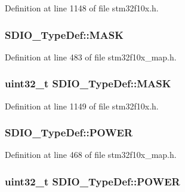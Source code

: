 Definition at line 1148 of file stm32f10x.\+h.

\subsubsection[{\texorpdfstring{M\+A\+SK}{MASK}}]{ S\+D\+I\+O\+\_\+\+Type\+Def\+::\+M\+A\+SK}\hypertarget{struct_s_d_i_o___type_def_a1a4242c4c212eedbc558577e7f42629d}{}\label{struct_s_d_i_o___type_def_a1a4242c4c212eedbc558577e7f42629d}


Definition at line 483 of file stm32f10x\+\_\+map.\+h.

\subsubsection[{\texorpdfstring{M\+A\+SK}{MASK}}]{ {\bf uint32\+\_\+t} S\+D\+I\+O\+\_\+\+Type\+Def\+::\+M\+A\+SK}\hypertarget{struct_s_d_i_o___type_def_a9a08e405ab985c60ff9031025ab37d31}{}\label{struct_s_d_i_o___type_def_a9a08e405ab985c60ff9031025ab37d31}


Definition at line 1149 of file stm32f10x.\+h.

\subsubsection[{\texorpdfstring{P\+O\+W\+ER}{POWER}}]{ S\+D\+I\+O\+\_\+\+Type\+Def\+::\+P\+O\+W\+ER}\hypertarget{struct_s_d_i_o___type_def_a7a5cac785f2196c67f2b3f8018d42327}{}\label{struct_s_d_i_o___type_def_a7a5cac785f2196c67f2b3f8018d42327}


Definition at line 468 of file stm32f10x\+\_\+map.\+h.

\subsubsection[{\texorpdfstring{P\+O\+W\+ER}{POWER}}]{ {\bf uint32\+\_\+t} S\+D\+I\+O\+\_\+\+Type\+Def\+::\+P\+O\+W\+ER}\hypertarget{struct_s_d_i_o___type_def_a7c156bc55f6d970a846a459d57a9e940}{}\label{struct_s_d_i_o___type_def_a7c156bc55f6d970a846a459d57a9e940}


